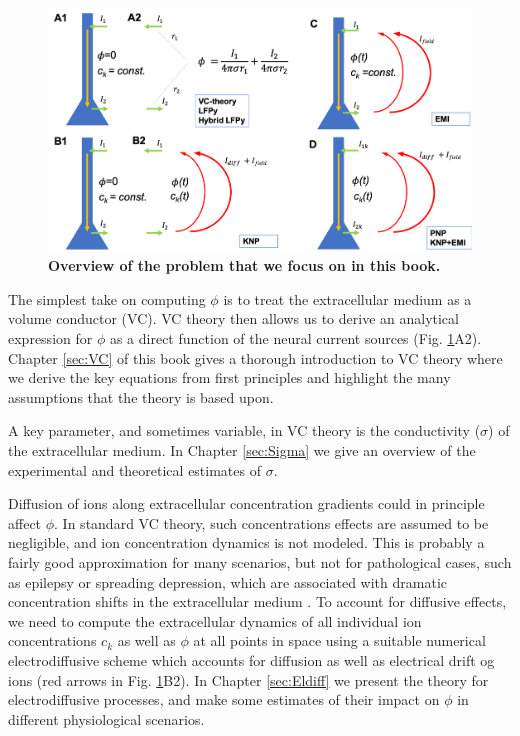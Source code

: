 \begin{figure}[!ht]
\begin{center}
\includegraphics[width=1\textwidth]{Figures/Skjemaoversikt.png}
\end{center}
\caption{\textbf{Overview of the problem that we focus on in this book.} 
}
\label{Intro:fig:Knallfigur}
\end{figure}

The simplest take on computing $\phi$ is to treat the extracellular medium as a volume conductor (VC). VC theory then allows us to derive an analytical expression for $\phi$ as a direct function of the neural current sources (Fig. \ref{Intro:fig:Knallfigur}A2). Chapter \ref{sec:VC} of this book gives a thorough introduction to VC theory where we derive the key equations from first principles and highlight the many assumptions that the theory is based upon.

A key parameter, and sometimes variable, in VC theory is the conductivity ($\sigma$) of the extracellular medium. In Chapter \ref{sec:Sigma} we give an overview of the experimental and theoretical estimates of $\sigma$. 

Diffusion of ions along extracellular concentration gradients could in principle affect $\phi$. In standard VC theory, such concentrations effects are assumed to be negligible, and ion concentration dynamics is not modeled. This is probably a fairly good approximation for many scenarios, but not for pathological cases, such as epilepsy or spreading depression, which are associated with dramatic concentration shifts in the extracellular medium \cite{Somjen2001, Frohlich2008, Zandt2015review, Ayata2015}. To account for diffusive effects, we need to compute the extracellular dynamics of all individual ion concentrations $c_k$ as well as $\phi$ at all points in space using a suitable numerical electrodiffusive scheme which accounts for diffusion as well as electrical drift og ions (red arrows in Fig. \ref{Intro:fig:Knallfigur}B2). In Chapter \ref{sec:Eldiff} we present the theory for electrodiffusive processes, and make some estimates of their impact on $\phi$ in different physiological scenarios. 

